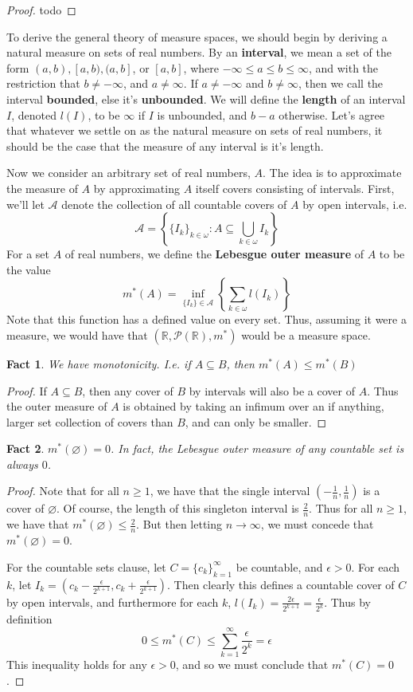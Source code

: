 \documentclass{article}
\theoremstyle{definition}
\theoremstyle{plain}
\theoremstyle{theorem}
\newtheorem{fact}{Fact}[section]
\begin{document}
\begin{proof}
	todo
\end{proof}
To derive the general theory of measure spaces, we should begin by deriving a natural measure on sets of real numbers. By an \textbf{interval}, we mean a set of the form $(a,b),[a,b),(a,b]$, or $[a,b]$, where $-\infty \leq a \leq b \leq \infty$, and with the restriction that $b \neq -\infty$, and $a \neq \infty$. If $a \neq -\infty$ and $b \neq \infty$, then we call the interval \textbf{bounded}, else it's \textbf{unbounded}. We will define the \textbf{length} of an interval $I$, denoted $l(I)$, to be $\infty$ if $I$ is unbounded, and $b-a$ otherwise. Let's agree that whatever we settle on as the natural measure on sets of real numbers, it should be the case that the measure of any interval is it's length. 
\par Now we consider an arbitrary set of real numbers, $A$. The idea is to approximate the measure of $A$ by approximating $A$ itself covers consisting of intervals. First, we'll let $\mathcal{A}$ denote the collection of all countable covers of $A$ by open intervals, i.e. 
\[ \mathcal{A} = \left\{\{I_k\}_{k \in \omega}: A \subseteq \bigcup_{k \in \omega}I_k\right\} \] For a set $A$ of real numbers, we define the \textbf{Lebesgue outer measure} of $A$ to be the value
\[ m^*(A) = \inf_{\{I_k\} \in \mathcal{A}} \left\{ \sum_{k\in \omega} l(I_k) \right\} \]
Note that this function has a defined value on every set. Thus, assuming it were a measure, we would have that $(\mathbb{R},\mathcal{P}(\mathbb{R}),m^*)$ would be a measure space. 
\begin{fact}
	We have monotonicity. I.e. if $A \subseteq B$, then $m^*(A) \leq m^*(B)$
\end{fact}
\begin{proof}
	If $A \subseteq B$, then any cover of $B$ by intervals will also be a cover of $A$. Thus the outer measure of $A$ is obtained by taking an infimum over an if anything, larger set collection of covers than $B$, and can only be smaller.
\end{proof}
\begin{fact}
	$m^*(\varnothing) = 0$. In fact, the Lebesgue outer measure of any countable set is always $0$. 
\end{fact}
\begin{proof}
	Note that for all $n \geq 1$, we have that the single interval $(-\frac{1}{n},\frac{1}{n})$ is a cover of $\varnothing$. Of course, the length of this singleton interval is $\frac{2}{n}$. Thus for all $n \geq 1$, we have that $m^*(\varnothing) \leq \frac{2}{n}$. But then letting $n \to \infty$, we must concede that $m^*(\varnothing) = 0$. 
	\par For the countable sets clause, let $C = \{c_k\}_{k=1}^{\infty}$ be countable, and $\epsilon > 0$. For each $k$, let $I_k = (c_k-\frac{\epsilon}{2^{k+1}},c_k+\frac{\epsilon}{2^{k+1}})$. Then clearly this defines a countable cover of $C$ by open intervals, and furthermore for each $k$, $l(I_k) = \frac{2\epsilon}{2^{k+1}} = \frac{\epsilon}{2^k}$. Thus by definition
	\[ 0 \leq m^*(C) \leq \sum_{k=1}^{\infty} \frac{\epsilon}{2^k} = \epsilon \]
This inequality holds for any $\epsilon > 0$, and so we must conclude that $m^*(C) = 0$. 
\end{proof}
\end{document}
